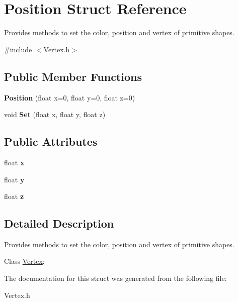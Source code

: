 \hypertarget{struct_position}{\section{Position Struct Reference}
\label{struct_position}
}


Provides methods to set the color, position and vertex of primitive shapes.  




{\ttfamily \#include $<$Vertex.\+h$>$}

\subsection*{Public Member Functions}
\begin{DoxyCompactItemize}
\item 
\hypertarget{struct_position_ab73d81912c4ead48cee5342d7cf5a33b}{{\bfseries Position} (float x=0, float y=0, float z=0)}\label{struct_position_ab73d81912c4ead48cee5342d7cf5a33b}

\item 
\hypertarget{struct_position_a2919b2441baf7a2f799791d65a1cfc15}{void {\bfseries Set} (float x, float y, float z)}\label{struct_position_a2919b2441baf7a2f799791d65a1cfc15}

\end{DoxyCompactItemize}
\subsection*{Public Attributes}
\begin{DoxyCompactItemize}
\item 
\hypertarget{struct_position_af684446cbf0f6d53386686283da6dcc6}{float {\bfseries x}}\label{struct_position_af684446cbf0f6d53386686283da6dcc6}

\item 
\hypertarget{struct_position_a54a6182b5f7539295b32255808897d3f}{float {\bfseries y}}\label{struct_position_a54a6182b5f7539295b32255808897d3f}

\item 
\hypertarget{struct_position_a5dc8c08d3d7209ba538ad21ba604aa44}{float {\bfseries z}}\label{struct_position_a5dc8c08d3d7209ba538ad21ba604aa44}

\end{DoxyCompactItemize}


\subsection{Detailed Description}
Provides methods to set the color, position and vertex of primitive shapes. 

Class \hyperlink{struct_vertex}{Vertex}\+: 

The documentation for this struct was generated from the following file\+:\begin{DoxyCompactItemize}
\item 
Vertex.\+h\end{DoxyCompactItemize}
